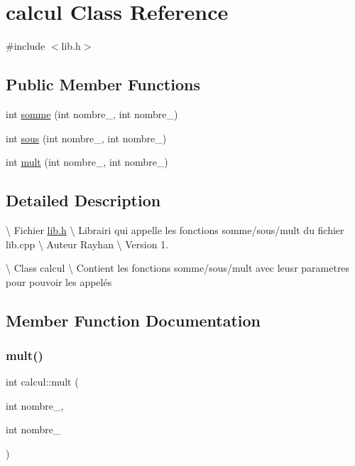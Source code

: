 \hypertarget{classcalcul}{}\section{calcul Class Reference}
\label{classcalcul}


{\ttfamily \#include $<$lib.\+h$>$}

\subsection*{Public Member Functions}
\begin{DoxyCompactItemize}
\item 
int \hyperlink{classcalcul_a40f51a847c5ac1001051a9631e5e1e08}{somme} (int nombre\+\_, int nombre\+\_)
\item 
int \hyperlink{classcalcul_a4e14ccbad7d73cdcfda888412e1bd959}{sous} (int nombre\+\_, int nombre\+\_)
\item 
int \hyperlink{classcalcul_a6b12cef6d18899cd39b7a61d1721ae46}{mult} (int nombre\+\_, int nombre\+\_)
\end{DoxyCompactItemize}


\subsection{Detailed Description}
\textbackslash{} Fichier \hyperlink{lib_8h_source}{lib.\+h} \textbackslash{} Librairi qui appelle les fonctions somme/sous/mult du fichier lib.\+cpp \textbackslash{} Auteur Rayhan \textbackslash{} Version 1.

\textbackslash{} Class calcul \textbackslash{} Contient les fonctions somme/sous/mult avec leusr parametres pour pouvoir les appelés 

\subsection{Member Function Documentation}
\mbox{\label{classcalcul_a6b12cef6d18899cd39b7a61d1721ae46}} 
\subsubsection{\texorpdfstring{mult()}{mult()}}
{\footnotesize\ttfamily int calcul\+::mult (\begin{DoxyParamCaption}\item[{int}]{nombre\+\_,  }\item[{int}]{nombre\+\_ }\end{DoxyParamCaption})}

